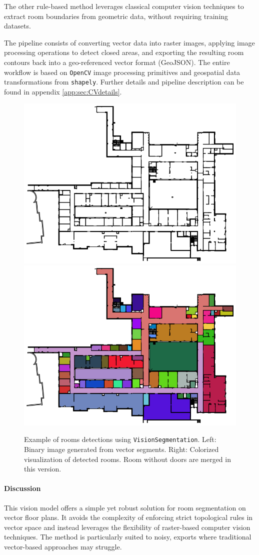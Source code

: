 \documentclass[11pt]{article}
\begin{document}
The other rule-based method leverages classical computer 
vision techniques to extract room boundaries from 
geometric data, without requiring training datasets.

The pipeline consists of converting vector data into raster images, applying 
image processing operations to detect closed areas, and exporting the resulting 
room contours back into a geo-referenced vector format (GeoJSON). The entire 
workflow is based on \texttt{OpenCV} image processing primitives and geospatial data 
transformations from \texttt{shapely}. Further details and pipeline description 
can be found in appendix \ref{app:sec:CVdetails}. 

\begin{figure}[htp!]
    \centering
    \includegraphics[width=0.48\linewidth]{figures/01.binary_image.png}
    \hfill
    \includegraphics[width=0.48\linewidth]{figures/02.contours_image.png}
    \caption{Example of rooms detections using \texttt{VisionSegmentation}. 
    Left: Binary image generated from vector segments. 
    Right: Colorized visualization of detected rooms. Room without doors are merged in this version.}
    \label{fig:geojson_and_colored}
\end{figure}


\paragraph{Discussion}
This vision model offers a simple yet robust solution for room segmentation on 
vector floor plans. It avoids the complexity of enforcing strict topological 
rules in vector space and instead leverages the flexibility of raster-based computer 
vision techniques. The method is particularly suited to noisy, exports where 
traditional vector-based approaches may struggle.
\end{document}

